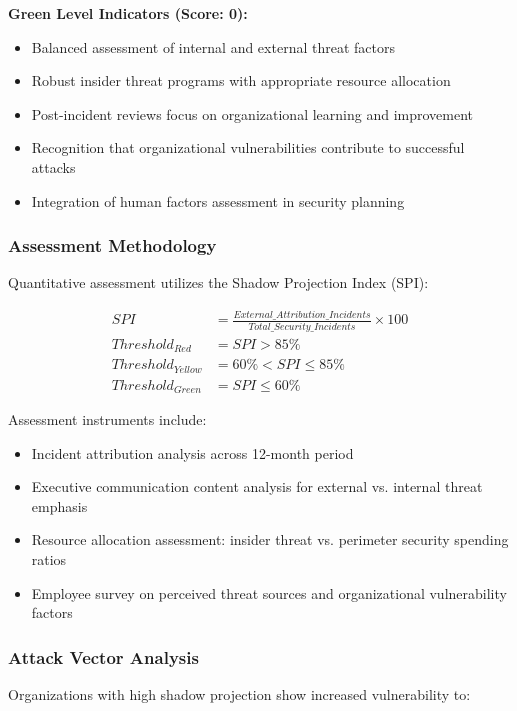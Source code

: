 \documentclass[11pt,a4paper]{article}
\begin{document}
\textbf{Green Level Indicators (Score: 0):}
\begin{itemize}
\item Balanced assessment of internal and external threat factors
\item Robust insider threat programs with appropriate resource allocation
\item Post-incident reviews focus on organizational learning and improvement
\item Recognition that organizational vulnerabilities contribute to successful attacks
\item Integration of human factors assessment in security planning
\end{itemize}

\subsubsection{Assessment Methodology}

Quantitative assessment utilizes the Shadow Projection Index (SPI):

\begin{align}
SPI &= \frac{External\_Attribution\_Incidents}{Total\_Security\_Incidents} \times 100 \\
Threshold_{Red} &= SPI > 85\% \\
Threshold_{Yellow} &= 60\% < SPI \leq 85\% \\
Threshold_{Green} &= SPI \leq 60\%
\end{align}

Assessment instruments include:
\begin{itemize}
\item Incident attribution analysis across 12-month period
\item Executive communication content analysis for external vs. internal threat emphasis
\item Resource allocation assessment: insider threat vs. perimeter security spending ratios
\item Employee survey on perceived threat sources and organizational vulnerability factors
\end{itemize}

\subsubsection{Attack Vector Analysis}

Organizations with high shadow projection show increased vulnerability to:
\end{document}

